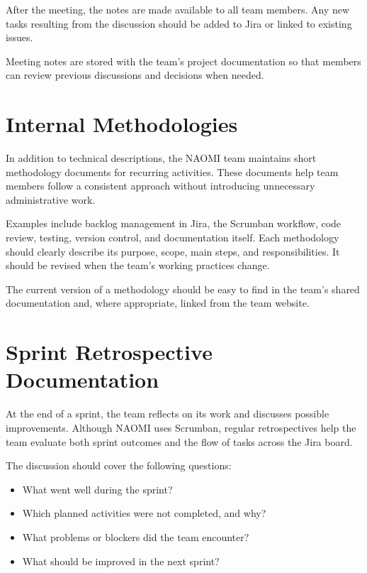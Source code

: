 \documentclass[12pt,a4paper]{article}
\begin{document}
After the meeting, the notes are made available
to all team members. Any new tasks resulting
from the discussion should be added to Jira
or linked to existing issues.

Meeting notes are stored with the team's
project documentation so that members can
review previous discussions and decisions
when needed.


\section{Internal Methodologies}

In addition to technical descriptions, the NAOMI team maintains short
methodology documents for recurring activities. These documents help team
members follow a consistent approach without introducing unnecessary
administrative work.

Examples include backlog management in Jira, the Scrumban workflow,
code review, testing, version control, and documentation itself.
Each methodology should clearly describe its purpose, scope, main steps,
and responsibilities. It should be revised when the team's working
practices change.

The current version of a methodology should be easy to find in the team's
shared documentation and, where appropriate, linked from the team website.


\section{Sprint Retrospective Documentation}

At the end of a sprint, the team reflects on its work and discusses possible
improvements. Although NAOMI uses Scrumban, regular retrospectives help the
team evaluate both sprint outcomes and the flow of tasks across the Jira
board.

The discussion should cover the following questions:

\begin{itemize}
    \item What went well during the sprint?
    \item Which planned activities were not completed, and why?
    \item What problems or blockers did the team encounter?
    \item What should be improved in the next sprint?
\end{itemize}
\end{document}
